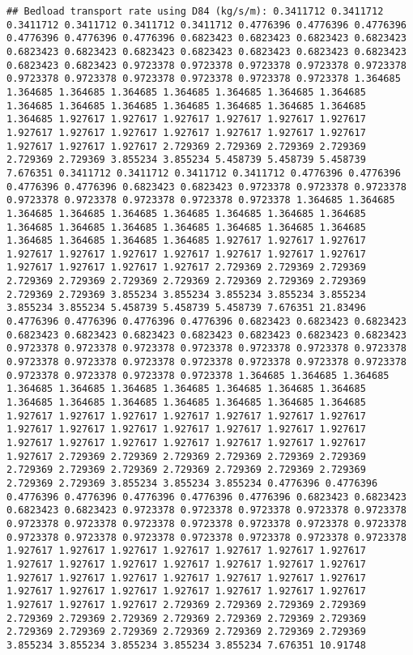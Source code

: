 \documentclass[
]{article}
\begin{document}
\begin{verbatim}
## Bedload transport rate using D84 (kg/s/m): 0.3411712 0.3411712 0.3411712 0.3411712 0.3411712 0.3411712 0.4776396 0.4776396 0.4776396 0.4776396 0.4776396 0.4776396 0.6823423 0.6823423 0.6823423 0.6823423 0.6823423 0.6823423 0.6823423 0.6823423 0.6823423 0.6823423 0.6823423 0.6823423 0.6823423 0.9723378 0.9723378 0.9723378 0.9723378 0.9723378 0.9723378 0.9723378 0.9723378 0.9723378 0.9723378 0.9723378 1.364685 1.364685 1.364685 1.364685 1.364685 1.364685 1.364685 1.364685 1.364685 1.364685 1.364685 1.364685 1.364685 1.364685 1.364685 1.364685 1.927617 1.927617 1.927617 1.927617 1.927617 1.927617 1.927617 1.927617 1.927617 1.927617 1.927617 1.927617 1.927617 1.927617 1.927617 1.927617 2.729369 2.729369 2.729369 2.729369 2.729369 2.729369 3.855234 3.855234 5.458739 5.458739 5.458739 7.676351 0.3411712 0.3411712 0.3411712 0.3411712 0.4776396 0.4776396 0.4776396 0.4776396 0.6823423 0.6823423 0.9723378 0.9723378 0.9723378 0.9723378 0.9723378 0.9723378 0.9723378 0.9723378 1.364685 1.364685 1.364685 1.364685 1.364685 1.364685 1.364685 1.364685 1.364685 1.364685 1.364685 1.364685 1.364685 1.364685 1.364685 1.364685 1.364685 1.364685 1.364685 1.364685 1.927617 1.927617 1.927617 1.927617 1.927617 1.927617 1.927617 1.927617 1.927617 1.927617 1.927617 1.927617 1.927617 1.927617 2.729369 2.729369 2.729369 2.729369 2.729369 2.729369 2.729369 2.729369 2.729369 2.729369 2.729369 2.729369 3.855234 3.855234 3.855234 3.855234 3.855234 3.855234 3.855234 5.458739 5.458739 5.458739 7.676351 21.83496 0.4776396 0.4776396 0.4776396 0.4776396 0.6823423 0.6823423 0.6823423 0.6823423 0.6823423 0.6823423 0.6823423 0.6823423 0.6823423 0.6823423 0.9723378 0.9723378 0.9723378 0.9723378 0.9723378 0.9723378 0.9723378 0.9723378 0.9723378 0.9723378 0.9723378 0.9723378 0.9723378 0.9723378 0.9723378 0.9723378 0.9723378 0.9723378 1.364685 1.364685 1.364685 1.364685 1.364685 1.364685 1.364685 1.364685 1.364685 1.364685 1.364685 1.364685 1.364685 1.364685 1.364685 1.364685 1.364685 1.927617 1.927617 1.927617 1.927617 1.927617 1.927617 1.927617 1.927617 1.927617 1.927617 1.927617 1.927617 1.927617 1.927617 1.927617 1.927617 1.927617 1.927617 1.927617 1.927617 1.927617 1.927617 2.729369 2.729369 2.729369 2.729369 2.729369 2.729369 2.729369 2.729369 2.729369 2.729369 2.729369 2.729369 2.729369 2.729369 2.729369 3.855234 3.855234 3.855234 0.4776396 0.4776396 0.4776396 0.4776396 0.4776396 0.4776396 0.4776396 0.6823423 0.6823423 0.6823423 0.6823423 0.9723378 0.9723378 0.9723378 0.9723378 0.9723378 0.9723378 0.9723378 0.9723378 0.9723378 0.9723378 0.9723378 0.9723378 0.9723378 0.9723378 0.9723378 0.9723378 0.9723378 0.9723378 0.9723378 1.927617 1.927617 1.927617 1.927617 1.927617 1.927617 1.927617 1.927617 1.927617 1.927617 1.927617 1.927617 1.927617 1.927617 1.927617 1.927617 1.927617 1.927617 1.927617 1.927617 1.927617 1.927617 1.927617 1.927617 1.927617 1.927617 1.927617 1.927617 1.927617 1.927617 1.927617 2.729369 2.729369 2.729369 2.729369 2.729369 2.729369 2.729369 2.729369 2.729369 2.729369 2.729369 2.729369 2.729369 2.729369 2.729369 2.729369 2.729369 2.729369 3.855234 3.855234 3.855234 3.855234 3.855234 7.676351 10.91748
\end{verbatim}
\end{document}

